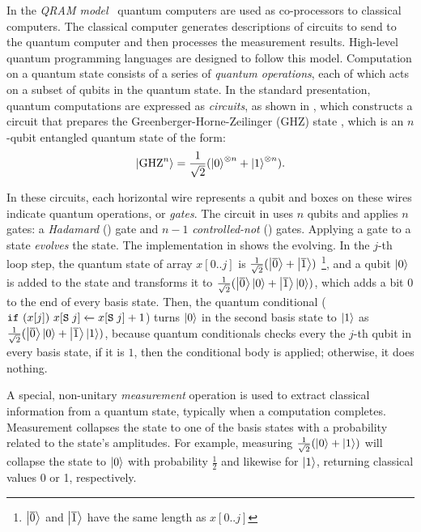  In the \emph{QRAM model}~\cite{Knill1996} quantum computers are used as co-processors to classical computers. The classical computer generates descriptions of circuits to send to the quantum computer and then processes the measurement results. High-level quantum programming languages are designed to follow this model.
Computation on a quantum state consists of a series of \emph{quantum operations}, each of which acts on a subset of qubits in the quantum state. In the standard presentation, quantum computations are expressed as \emph{circuits}, as shown in , which constructs a circuit that prepares the Greenberger-Horne-Zeilinger (GHZ) state \cite{Greenberger1989}, which is an $n$-qubit entangled quantum state of the form:
\begin{align*}
    \left\vert{\text{GHZ}^n}\right\rangle = \frac{1}{\sqrt{2}}(\left\vert{0}\right\rangle^{\otimes n}+\left\vert{1}\right\rangle^{\otimes n}).
\end{align*}

In these circuits, each horizontal wire represents a qubit and boxes on these wires indicate quantum operations, or \emph{gates}. The circuit in  uses $n$ qubits and applies $n$ gates: a \emph{Hadamard} () gate and $n-1$ \emph{controlled-not} () gates.
Applying a gate to a state \emph{evolves} the state. 
The \qafny implementation in  shows the evolving. In the $j$-th loop step, the quantum state of array $x[0..j]$ is $\frac{1}{\sqrt{2}}(\left\vert{\overline{0}}\right\rangle+\left\vert{\overline{1}}\right\rangle)$ \footnote{$\left\vert{\overline{0}}\right\rangle$ and $\left\vert{\overline{1}}\right\rangle$ have the same length as $x[0..j]$}, and a qubit $\left\vert{0}\right\rangle$ is added to the state and transforms it to $\frac{1}{\sqrt{2}}(\left\vert{\overline{0}}\right\rangle\left\vert{0}\right\rangle+\left\vert{\overline{1}}\right\rangle\left\vert{0}\right\rangle)$, which adds a bit $0$ to the end of every basis state. Then, the quantum conditional 
($\texttt{if}~{(x[j])}~{{x[\texttt{S}\;j]} \xleftarrow{} {x[\texttt{S}\;j]+1}}$) turns $\left\vert{0}\right\rangle$ in the second basis state to $\left\vert{1}\right\rangle$ as $\frac{1}{\sqrt{2}}(\left\vert{\overline{0}}\right\rangle\left\vert{0}\right\rangle+\left\vert{\overline{1}}\right\rangle\left\vert{1}\right\rangle)$, because quantum conditionals checks every the $j$-th qubit in every basis state, if it is $1$, then the conditional body is applied; otherwise, it does nothing.

 A special, non-unitary \emph{measurement} operation is used to extract classical information from a quantum state, typically when a computation completes. Measurement collapses the state to one of the basis states with a probability related to the state's amplitudes. For example, measuring $\frac{1}{\sqrt{2}}(\left\vert{0}\right\rangle + \left\vert{1}\right\rangle)$ will collapse the state to $\left\vert{0}\right\rangle$ with probability $\frac{1}{2}$ and likewise for $\left\vert{1}\right\rangle$, returning classical values 0 or 1, respectively.

